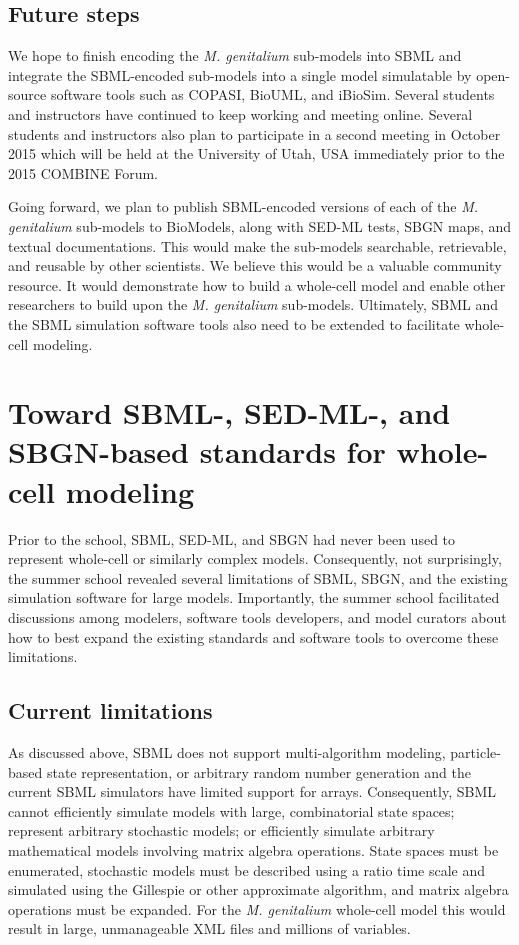 \documentclass[journal,transmag]{IEEEtran}
\begin{document}
\subsection{Future steps}
We hope to finish encoding the \textit{M. genitalium} sub-models into SBML and integrate the SBML-encoded sub-models into a single model simulatable by open-source software tools such as COPASI, BioUML, and iBioSim. Several students and instructors have continued to keep working and meeting online. Several students and instructors also plan to participate in a second meeting in October 2015 which will be held at the University of Utah, USA immediately prior to the 2015 COMBINE Forum.

Going forward, we plan to publish SBML-encoded versions of each of the \textit{M. genitalium} sub-models to BioModels, along with SED-ML tests, SBGN maps, and textual documentations. This would make the sub-models searchable, retrievable, and reusable by other scientists. We believe this would be a valuable community resource. It would demonstrate how to build a whole-cell model and enable other researchers to build upon the \textit{M. genitalium} sub-models. Ultimately, SBML and the SBML simulation software tools also need to be extended to facilitate whole-cell modeling.


\section{Toward SBML-, SED-ML-, and SBGN-based standards for whole-cell modeling}
Prior to the school, SBML, SED-ML, and SBGN had never been used to represent whole-cell or similarly complex models. Consequently, not surprisingly, the summer school revealed several limitations of SBML, SBGN, and the existing simulation software for large models. Importantly, the summer school facilitated discussions among modelers, software tools developers, and model curators about how to best expand the existing standards and software tools to overcome these limitations.

\subsection{Current limitations}
As discussed above, SBML does not support multi-algorithm modeling, particle-based state representation, or arbitrary random number generation and the current SBML simulators have limited support for arrays. Consequently, SBML cannot efficiently simulate models with large, combinatorial state spaces; represent arbitrary stochastic models; or efficiently simulate arbitrary mathematical models involving matrix algebra operations. State spaces must be enumerated, stochastic models must be described using a ratio time scale and simulated using the Gillespie or other approximate algorithm, and matrix algebra operations must be expanded. For the \textit{M. genitalium} whole-cell model this would result in large, unmanageable XML files and millions of variables.
\end{document}
